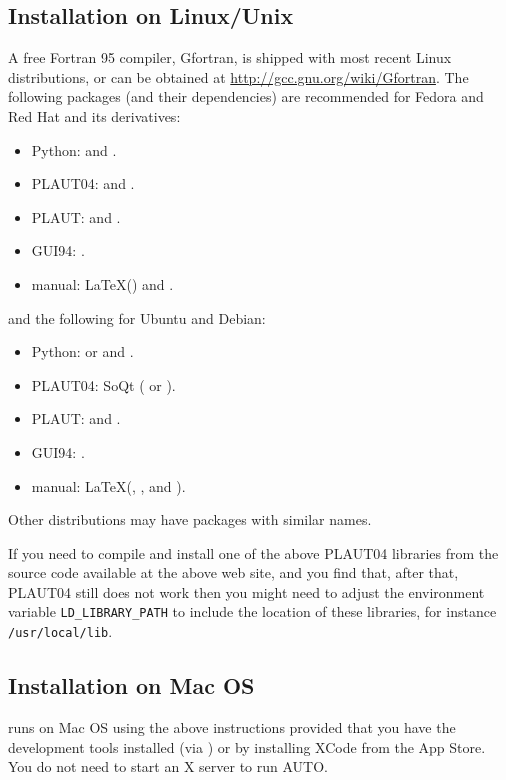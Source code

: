 \documentclass[12pt]{report}
\begin{document}
\subsection{Installation on Linux/Unix}
A free Fortran 95 compiler, Gfortran, is shipped with most recent
Linux distributions, or can be obtained at 
\url{http://gcc.gnu.org/wiki/Gfortran}.
The following packages (and their dependencies) are recommended for
Fedora and Red Hat and its derivatives:
\begin{itemize}
\item Python:  and .
\item {\cal PLAUT04}:  and .
\item {\cal PLAUT}:  and .
\item GUI94: .
\item manual: \LaTeX () and .
\end{itemize}
and the following for Ubuntu and Debian:
\begin{itemize}
\item Python:  or  and .
\item {\cal PLAUT04}: SoQt ( or ).
\item {\cal PLAUT}:  and .
\item GUI94: .
\item manual: \LaTeX (, , and ).
\end{itemize}
Other distributions may have packages with similar names.

If you need to compile and install one of the above {\cal PLAUT04} libraries
from the source code available at the above web site, and you
find that, after that, {\cal PLAUT04} still does not work then you might need to
adjust the environment variable {\tt LD\_LIBRARY\_PATH} to include
the location of these libraries, for instance {\tt /usr/local/lib}.

\subsection{Installation on Mac OS}
\AUTO runs on Mac OS using the above instructions provided that
you have the development tools installed (via ) or by installing XCode from the App Store.
You do not need to start an X server to run AUTO.
\end{document}
